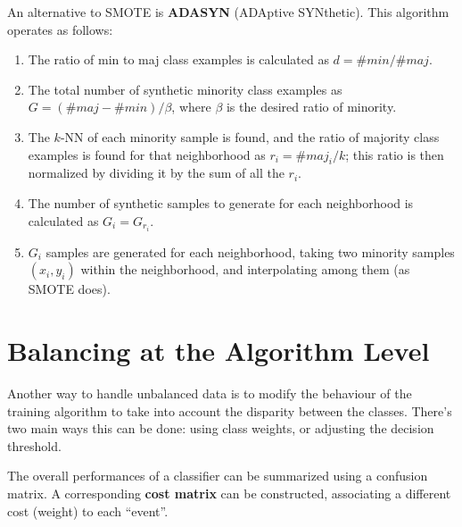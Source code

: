 An alternative to SMOTE is \textbf{ADASYN} (ADAptive SYNthetic). This algorithm operates as follows:
\begin{enumerate}
    \item The ratio of min to maj class examples is calculated as $d = \#\textit{min}/\#\textit{maj}$.

    \item The total number of synthetic minority class examples as $G = (\#\textit{maj} - \#\textit{min}) / \beta$, where $\beta$ is the desired ratio of minority.

    \item The $k$-NN of each minority sample is found, and the ratio of majority class examples is found for that neighborhood as $r_i = \#\textit{maj}_i / k$; this ratio is then normalized by dividing it by the sum of all the $r_i$.

    \item The number of synthetic samples to generate for each neighborhood is calculated as $G_i = G_{r_i}$.

    \item $G_i$ samples are generated for each neighborhood, taking two minority samples $(x_i, y_i)$ within the neighborhood, and interpolating among them (as SMOTE does).
\end{enumerate}

\section{Balancing at the Algorithm Level}

Another way to handle unbalanced data is to modify the behaviour of the training algorithm to take into account the disparity between the classes. There's two main ways this can be done: using class weights, or adjusting the decision threshold.

The overall performances of a classifier can be summarized using a confusion matrix. A corresponding \textbf{cost matrix} can be constructed, associating a different cost (weight) to each ``event''.

